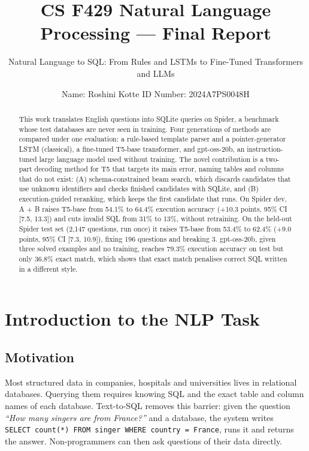 \documentclass[
  10pt,
]{article}
\title{\textbf{CS F429 Natural Language Processing --- Final Report}}
\subtitle{Natural Language to SQL: From Rules and LSTMs to Fine-Tuned
Transformers and LLMs}
\author{Name: Roshini Kotte \textbar{} ID Number: 2024A7PS0048H}
\date{}
\begin{document}
\maketitle
\begin{abstract}
This work translates English questions into SQLite queries on Spider, a
benchmark whose test databases are never seen in training. Four
generations of methods are compared under one evaluation: a rule-based
template parser and a pointer-generator LSTM (classical), a fine-tuned
T5-base transformer, and gpt-oss-20b, an instruction-tuned large
language model used without training. The novel contribution is a
two-part decoding method for T5 that targets its main error, naming
tables and columns that do not exist: (A) schema-constrained beam
search, which discards candidates that use unknown identifiers and
checks finished candidates with SQLite, and (B) execution-guided
reranking, which keeps the first candidate that runs. On Spider dev, A +
B raises T5-base from 54.1\% to 64.4\% execution accuracy (+10.3 points,
95\% CI {[}7.5, 13.3{]}) and cuts invalid SQL from 31\% to 13\%, without
retraining. On the held-out Spider test set (2,147 questions, run once)
it raises T5-base from 53.4\% to 62.4\% (+9.0 points, 95\% CI {[}7.3,
10.9{]}), fixing 196 questions and breaking 3. gpt-oss-20b, given three
solved examples and no training, reaches 79.3\% execution accuracy on
test but only 36.8\% exact match, which shows that exact match penalises
correct SQL written in a different style.
\end{abstract}

\section{Introduction to the NLP
Task}\label{introduction-to-the-nlp-task}

\subsection{Motivation}\label{motivation}

Most structured data in companies, hospitals and universities lives in
relational databases. Querying them requires knowing SQL and the exact
table and column names of each database. Text-to-SQL removes this
barrier: given the question \emph{``How many singers are from France?''}
and a database, the system writes
\texttt{SELECT\ count(*)\ FROM\ singer\ WHERE\ country\ =\ \textquotesingle{}France\textquotesingle{}},
runs it and returns the answer. Non-programmers can then ask questions
of their data directly.
\end{document}
